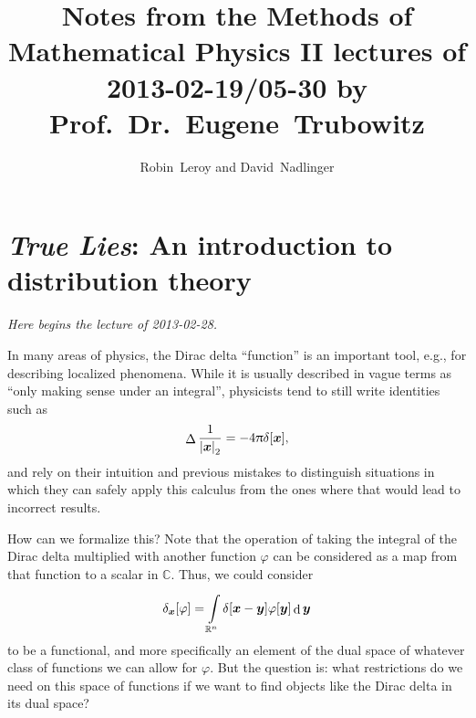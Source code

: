 \documentclass[10pt]{article}
\title{Notes from the Methods of Mathematical Physics II lectures of 2013-02-19{\slash}05-30 by Prof.~Dr.~Eugene~Trubowitz}
\author{Robin~Leroy and David~Nadlinger}
\DeclarePairedDelimiter\singleBars{\lvert}{\rvert}
\DeclarePairedDelimiter\parentheses{\lparen}{\rparen}
\DeclarePairedDelimiter\squareBrackets{[}{]}
\newcommand{\Dirac}[1][]{\delta_{#1}}
\DeclareMathOperator{\Laplacian}{\Delta}
\DeclareMathOperator{\diffd}{d}
\newcommand{\R}{\mathbb{R}}
\newcommand{\C}{\mathbb{C}}
\newcommand\of[1]{\parentheses*{#1}}
\newcommand\norm[1]{\singleBars*{#1}}
\newcommand\gj\varphi
\newcommand{\vx}{{\vectorsym x}}
\newcommand{\vy}{{\vectorsym y}}
\renewcommand\of[1]{\squareBrackets*{#1}}
\renewcommand\norm[1]{\singleBars*{#1}_{2}}
\newcommand{\Rn}{{\R^n}}
\newcommand{\lectureStart}[1]{

\noindent \emph{Here begins the lecture of #1.}

}
\begin{document}
  \maketitle
  \section{\emph{True Lies}: An introduction to distribution theory}
  \lectureStart{2013-02-28}
  In many areas of physics, the Dirac delta ``function'' is an important tool, e.g., for describing localized phenomena. While it is usually described in vague terms as ``only making sense under an integral'', physicists tend to still write identities such as
  \begin{equation*}
    \Laplacian\frac{1}{\norm{\vx}} = -4 \Pi \Dirac\of\vx,
  \end{equation*}
  and rely on their intuition and previous mistakes to distinguish situations in which they can safely apply this calculus from the ones where that would lead to incorrect results.

  How can we formalize this? Note that the operation of taking the integral of the Dirac delta multiplied with another function $\gj$ can be considered as a map from that function to a scalar in $\C$. Thus, we could consider
  \begin{equation*}
    \Dirac[\vx]\of\gj = \int\Rn \Dirac\of{\vx - \vy} \gj\of\vy \diffd\vy
  \end{equation*}
  to be a functional, and more specifically an element of the dual space of whatever class of functions we can allow for $\gj$. But the question is: what restrictions do we need on this space of functions if we want to find objects like the Dirac delta in its dual space?
\end{document}
